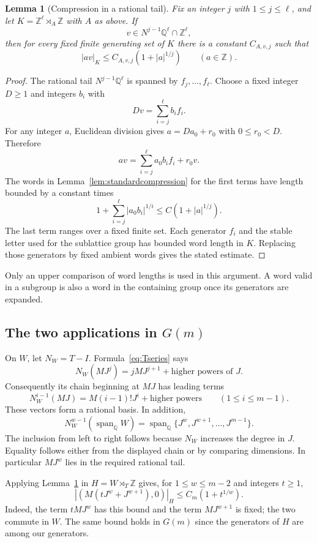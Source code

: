 \documentclass[11pt]{article}
\numberwithin{equation}{section}
\newtheorem{lemma}[theorem]{Lemma}
\theoremstyle{definition}
\theoremstyle{remark}
\newcommand{\Z}{\mathbb Z}
\newcommand{\Q}{\mathbb Q}
\begin{document}
\begin{lemma}[Compression in a rational tail]\label{lem:generalcompression}
Fix an integer $j$ with $1\le j\le\ell$, and let $K=\Z^\ell\rtimes_A\Z$ with $A$ as above. If
\[
v\in N^{j-1}\Q^\ell\cap\Z^\ell,
\]
then for every fixed finite generating set of $K$ there is a constant $C_{A,v,j}$ such that
\begin{equation}\label{eq:generalcompression}
|a v|_K\le C_{A,v,j}(1+|a|^{1/j})\qquad(a\in\Z).
\end{equation}
\end{lemma}
\begin{proof}
The rational tail $N^{j-1}\Q^\ell$ is spanned by $f_j,\ldots,f_\ell$. Choose a fixed integer $D\ge1$ and integers $b_i$ with
\[
Dv=\sum_{i=j}^\ell b_i f_i.
\]
For any integer $a$, Euclidean division gives $a=Da_0+r_0$ with $0\le r_0<D$. Therefore
\[
av=\sum_{i=j}^\ell a_0b_i f_i+r_0v.
\]
The words in Lemma~\ref{lem:standardcompression} for the first terms have length bounded by a constant times
\[
1+\sum_{i=j}^\ell|a_0b_i|^{1/i}\le C(1+|a|^{1/j}).
\]
The last term ranges over a fixed finite set. Each generator $f_i$ and the stable letter used for the sublattice group has bounded word length in $K$. Replacing those generators by fixed ambient words gives the stated estimate.
\end{proof}

Only an upper comparison of word lengths is used in this argument. A word valid in a subgroup is also a word in the containing group once its generators are expanded.

\subsection{The two applications in \texorpdfstring{$G(m)$}{G(m)}}
On $W$, let $N_W=T-I$. Formula~\eqref{eq:Tseries} says
\[
N_W(MJ^j)=jMJ^{j+1}+\text{higher powers of }J.
\]
Consequently its chain beginning at $MJ$ has leading terms
\[
N_W^{i-1}(MJ)=M(i-1)!J^i+\text{higher powers}\qquad(1\le i\le m-1).
\]
These vectors form a rational basis. In addition,
\[
N_W^{w-1}(\operatorname{span}_{\Q}W)
=\operatorname{span}_{\Q}\{J^w,J^{w+1},\ldots,J^{m-1}\}.
\]
The inclusion from left to right follows because $N_W$ increases the degree in $J$. Equality follows either from the displayed chain or by comparing dimensions. In particular $MJ^w$ lies in the required rational tail.

Applying Lemma~\ref{lem:generalcompression} in $H=W\rtimes_T\Z$ gives, for $1\le w\le m-2$ and integers $t\ge1$,
\begin{equation}\label{eq:actingcompression}
|(M(tJ^w+J^{w+1}),0)|_H\le C_m(1+t^{1/w}).
\end{equation}
Indeed, the term $tMJ^w$ has this bound and the term $MJ^{w+1}$ is fixed; the two commute in $W$. The same bound holds in $G(m)$ since the generators of $H$ are among our generators.
\end{document}
